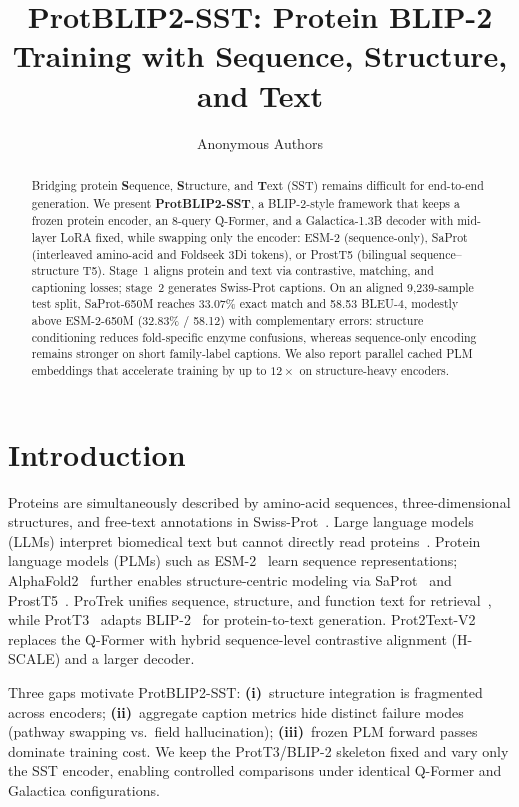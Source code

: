 \documentclass{article}
\title{ProtBLIP2-SST: Protein BLIP-2 Training with Sequence, Structure, and Text}
\author{Anonymous Authors}
\begin{document}
\maketitle

\begin{abstract}
Bridging protein \textbf{S}equence, \textbf{S}tructure, and \textbf{T}ext (SST) remains difficult for end-to-end generation.
We present \textbf{ProtBLIP2-SST}, a BLIP-2-style framework that keeps a frozen protein encoder, an 8-query Q-Former, and a Galactica-1.3B decoder with mid-layer LoRA fixed, while swapping only the encoder: ESM-2 (sequence-only), SaProt (interleaved amino-acid and Foldseek 3Di tokens), or ProstT5 (bilingual sequence--structure T5).
Stage~1 aligns protein and text via contrastive, matching, and captioning losses; stage~2 generates Swiss-Prot captions.
On an aligned 9{,}239-sample test split, SaProt-650M reaches 33.07\% exact match and 58.53 BLEU-4, modestly above ESM-2-650M (32.83\% / 58.12) with complementary errors: structure conditioning reduces fold-specific enzyme confusions, whereas sequence-only encoding remains stronger on short family-label captions.
We also report parallel cached PLM embeddings that accelerate training by up to $12\times$ on structure-heavy encoders.
\end{abstract}

\section{Introduction}
\label{sec:intro}

Proteins are simultaneously described by amino-acid sequences, three-dimensional structures, and free-text annotations in Swiss-Prot~\cite{bairoch2000swissprot}.
Large language models (LLMs) interpret biomedical text but cannot directly read proteins~\cite{taylor2022galactica}.
Protein language models (PLMs) such as ESM-2~\cite{lin2023esm2} learn sequence representations; AlphaFold2~\cite{varadi2022alphafolddb} further enables structure-centric modeling via SaProt~\cite{su2023saprot} and ProstT5~\cite{heinzinger2024prostt5}.
ProTrek unifies sequence, structure, and function text for retrieval~\cite{su2025protrek}, while ProtT3~\cite{liu2024prott3} adapts BLIP-2~\cite{li2023blip2} for protein-to-text generation.
Prot2Text-V2~\cite{fei2025prot2text} replaces the Q-Former with hybrid sequence-level contrastive alignment (H-SCALE) and a larger decoder.

Three gaps motivate ProtBLIP2-SST:
\textbf{(i)}~structure integration is fragmented across encoders;
\textbf{(ii)}~aggregate caption metrics hide distinct failure modes (pathway swapping vs.\ field hallucination);
\textbf{(iii)}~frozen PLM forward passes dominate training cost.
We keep the ProtT3/BLIP-2 skeleton fixed and vary only the SST encoder, enabling controlled comparisons under identical Q-Former and Galactica configurations.
\end{document}
